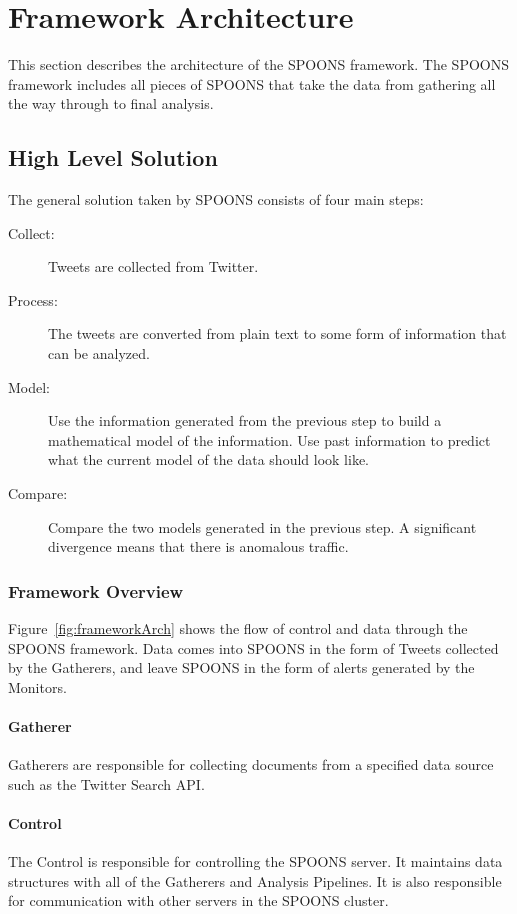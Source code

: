\documentclass[12pt]{ucthesis}
\begin{document}
\chapter{Framework Architecture}
\label{arch-framework}
This section describes the architecture of the SPOONS framework. The SPOONS framework includes all pieces of SPOONS
that take the data from gathering all the way through to final analysis.

\section{High Level Solution}
\label{arch-framework-highlevel}

The general solution taken by SPOONS consists of four main steps:

\begin{description}
   \item[Collect:]
      Tweets are collected from Twitter.
   \item[Process:]
      The tweets are converted from plain text to some form of information that can be analyzed.
   \item[Model:]
      Use the information generated from the previous step to build a mathematical model of the information.
      Use past information to predict what the current model of the data should look like.
   \item[Compare:]
      Compare the two models generated in the previous step. A significant divergence means that there is
      anomalous traffic.
\end{description}

\subsection{Framework Overview}
\label{arch-framework-highlevel-overview}

Figure~\ref{fig:frameworkArch} shows the flow of control and data through the SPOONS framework. Data comes into SPOONS
in the form of Tweets collected by the Gatherers, and leave SPOONS in the form of alerts generated by the Monitors.

\subsubsection{Gatherer}
Gatherers are responsible for collecting documents from a specified data source such as the Twitter Search API.

\subsubsection{Control}
The Control is responsible for controlling the SPOONS server. It maintains data structures with all of the Gatherers and
Analysis Pipelines. It is also responsible for communication with other servers in the SPOONS cluster.
\end{document}
